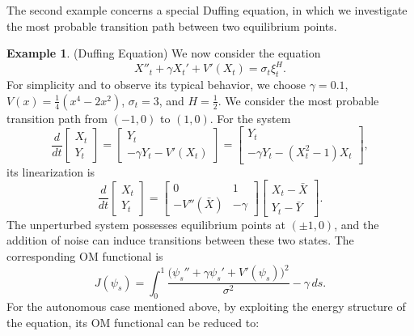 \documentclass{article}
\theoremstyle{definition}  %
\newtheorem{example}{Example}[section]
\theoremstyle{plain}  %
\begin{document}
    The second example concerns a special Duffing equation, in which we investigate the most probable transition path between two equilibrium points.
 \begin{example}(Duffing Equation)
We now consider the equation
\begin{equation}  \label{equation 2}
    X''_t + \gamma X_t' + V'(X_t) = \sigma_t \xi_t^H .
\end{equation}
For simplicity and to observe its typical behavior, we choose 
$\gamma = 0.1$, $V(x) = \frac{1}{4}(x^4 - 2x^2)$, $\sigma_t = 3$, and $H = \frac{1}{2}$.
We consider the most probable transition path from $(-1, 0)$ to $(1, 0)$. 
For the system
\begin{equation*}
    \frac{d}{dt} \begin{bmatrix} X_t \\ Y_t \end{bmatrix} 
    = \begin{bmatrix} 
        Y_t \\ 
        -\gamma Y_t - V'(X_t)
    \end{bmatrix}
    = \begin{bmatrix}
        Y_t \\ 
        -\gamma Y_t - (X_t^2-1)X_t
    \end{bmatrix},
\end{equation*}
its linearization is
\begin{equation*}
    \frac{d}{dt} \begin{bmatrix} X_t \\ Y_t \end{bmatrix} 
    = \begin{bmatrix} 
        0 & 1 \\
        -V''(\bar{X}) & -\gamma 
    \end{bmatrix}
    \begin{bmatrix} X_t - \bar{X} \\ Y_t - \bar{Y} \end{bmatrix}.
\end{equation*}
The unperturbed system possesses equilibrium points at $(\pm 1, 0)$, and the addition of noise can induce transitions between these two states.
The corresponding OM functional is
\begin{equation*}
    J(\psi_s) = \int_0^1 \frac{\bigl( \psi_s'' + \gamma \psi_s' + V'(\psi_s) \bigr)^2}{\sigma^2} - \gamma  \, ds .
\end{equation*} 
For the autonomous case mentioned above, by exploiting the energy structure of the equation, its  OM functional can be reduced to:

\end{example}
\end{document}
